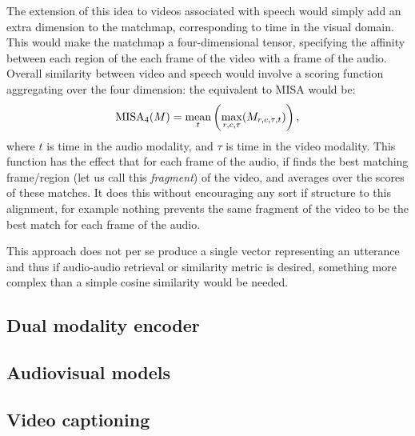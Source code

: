 The extension of this idea to videos associated with speech would
simply add an extra dimension to the matchmap, corresponding to time
in the visual domain. This would make the matchmap a four-dimensional
tensor, specifying the affinity between each region of the each frame
of the video with a frame of the audio. Overall similarity between
video and speech would involve a scoring function aggregating over
the four dimension: the equivalent to MISA would be:
\begin{equation}
  \label{eq:misa4}
  \mathrm{MISA}_4(M) = \operatorname*{mean}_t \left(\max_{r,c,\tau}(M_{r,c,\tau,t})\right),
\end{equation}
where $t$ is time in the audio modality, and $\tau$ is time in the
video modality. This function has the effect that for each frame of
the audio, if finds the best matching frame/region (let us call this
{\it fragment}) of the video, and averages over the scores of these
matches. It does this without encouraging any sort if structure to
this alignment, for example nothing prevents the same fragment of the
video to be the best match for each frame of the audio.

This approach does not per se produce a single vector representing an
utterance and thus if audio-audio retrieval or similarity metric is
desired, something more complex than a simple cosine similarity would
be needed.

\subsection{Dual modality encoder}


\subsection{Audiovisual models}
\citet{aytar2016soundnet,owens2016visually,owens2016ambient}
\subsection{Video captioning}
\citet{krishna2017dense,zhou2018end}